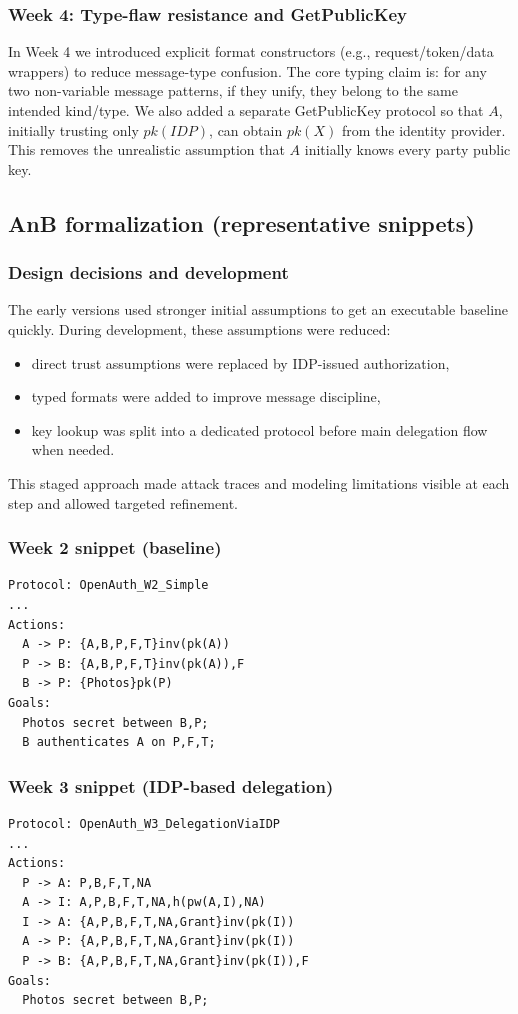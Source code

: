 \documentclass[11pt,a4paper]{article}
\begin{document}
\subsubsection{Week 4: Type-flaw resistance and GetPublicKey}
In Week 4 we introduced explicit format constructors (e.g., request/token/data wrappers) to reduce message-type confusion.
The core typing claim is: for any two non-variable message patterns, if they unify, they belong to the same intended kind/type.
We also added a separate GetPublicKey protocol so that $A$, initially trusting only $pk(IDP)$, can obtain $pk(X)$ from the identity provider.
This removes the unrealistic assumption that $A$ initially knows every party public key.

\subsection{AnB formalization (representative snippets)}
\subsubsection{Design decisions and development}
The early versions used stronger initial assumptions to get an executable baseline quickly.
During development, these assumptions were reduced:
\begin{itemize}[leftmargin=1.2em]
  \item direct trust assumptions were replaced by IDP-issued authorization,
  \item typed formats were added to improve message discipline,
  \item key lookup was split into a dedicated protocol before main delegation flow when needed.
\end{itemize}
This staged approach made attack traces and modeling limitations visible at each step and allowed targeted refinement.

\subsubsection{Week 2 snippet (baseline)}
\begin{lstlisting}
Protocol: OpenAuth_W2_Simple
...
Actions:
  A -> P: {A,B,P,F,T}inv(pk(A))
  P -> B: {A,B,P,F,T}inv(pk(A)),F
  B -> P: {Photos}pk(P)
Goals:
  Photos secret between B,P;
  B authenticates A on P,F,T;
\end{lstlisting}

\subsubsection{Week 3 snippet (IDP-based delegation)}
\begin{lstlisting}
Protocol: OpenAuth_W3_DelegationViaIDP
...
Actions:
  P -> A: P,B,F,T,NA
  A -> I: A,P,B,F,T,NA,h(pw(A,I),NA)
  I -> A: {A,P,B,F,T,NA,Grant}inv(pk(I))
  A -> P: {A,P,B,F,T,NA,Grant}inv(pk(I))
  P -> B: {A,P,B,F,T,NA,Grant}inv(pk(I)),F
Goals:
  Photos secret between B,P;
\end{lstlisting}
\end{document}
